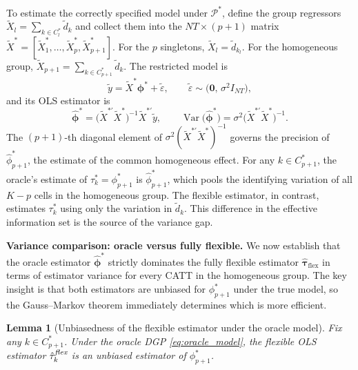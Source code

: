 \documentclass[12pt]{article}
\newtheorem{lemma}{Lemma}
\DeclareMathOperator{\Var}{Var}
\newcommand{\1}{\mathbbm{1}}
\newcommand{\ytd}{\tilde{y}}
\newcommand{\Xtd}{\tilde{X}}
\begin{document}
To estimate the correctly specified model under $\mathcal{P}^*$, define the
group regressors $\Xtd_l = \sum_{k \in C_l^*} \tilde{d}_k$ and collect them
into the $NT \times (p+1)$ matrix
$\Xtd^* = [\tilde{X}_1^*, \ldots, \tilde{X}_p^*, \tilde{X}_{p+1}^*]$.
For the $p$ singletons, $\Xtd_l = \tilde{d}_{k_l}$.
For the homogeneous group, $\Xtd_{p+1} = \sum_{k \in C_{p+1}^*} \tilde{d}_k$.
The restricted model is
\begin{equation}
  \ytd = \Xtd^*\bm{\phi}^* + \tilde{\varepsilon},
  \qquad
  \tilde{\varepsilon} \sim \bigl(\mathbf{0},\,\sigma^2 I_{NT}\bigr),
  \label{eq:oracle_model}
\end{equation}
and its OLS estimator is
\begin{equation}
  \hat{\bm{\phi}}^* = \bigl(\Xtd^{*\prime}\Xtd^*\bigr)^{-1}\Xtd^{*\prime}\ytd,
  \qquad
  \Var\!\bigl(\hat{\bm{\phi}}^*\bigr)
  = \sigma^2\bigl(\Xtd^{*\prime}\Xtd^*\bigr)^{-1}.
  \label{eq:oracle_var}
\end{equation}
The $(p+1)$-th diagonal element of $\sigma^2(\Xtd^{*\prime}\Xtd^*)^{-1}$
governs the precision of $\hat\phi_{p+1}^*$, the estimate of the common
homogeneous effect.
For any $k \in C_{p+1}^*$, the oracle's estimate of $\tau_k^* =
\phi_{p+1}^*$ is $\hat\phi_{p+1}^*$, which pools the identifying variation
of all $K-p$ cells in the homogeneous group.
The flexible estimator, in contrast, estimates $\tau_k^*$ using only
the variation in $\tilde{d}_k$.
This difference in the effective information set is the source of the
variance gap.

\bigskip

\noindent\textbf{Variance comparison: oracle versus fully flexible.}
We now establish that the oracle estimator $\hat{\bm{\phi}}^*$ strictly
dominates the fully flexible estimator $\hat{\bm{\tau}}_{\text{flex}}$
in terms of estimator variance for every CATT in the homogeneous group.
The key insight is that both estimators are unbiased for $\phi_{p+1}^*$
under the true model, so the Gauss--Markov theorem immediately determines
which is more efficient.

\begin{lemma}[Unbiasedness of the flexible estimator under the oracle model]
  \label{lem:unbiased}
  Fix any $k \in C_{p+1}^*$.  Under the oracle DGP
  \eqref{eq:oracle_model}, the flexible OLS estimator $\hat\tau_k^{\emph{flex}}$
  is an unbiased estimator of $\phi_{p+1}^*$.
\end{lemma}
\end{document}
